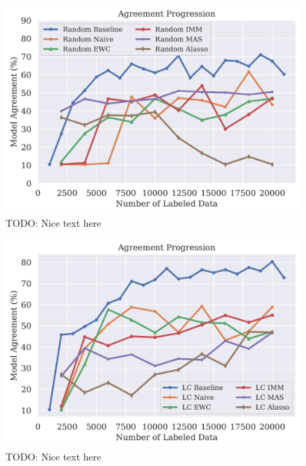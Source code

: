 \begin{figure}[h]
    \centering
    \includegraphics[width=0.8\linewidth]{images/results_CALMS/mnist_label_random.png}
    \caption[Agreement Comparison for Model Stealing on MNIST using the top1-label and the Active Learning strategy Random]{TODO: Nice text here}
    \label{fig:CALMSMNISTLabelRandom}
\end{figure}

\begin{figure}[h]
    \centering
    \includegraphics[width=0.8\linewidth]{images/results_CALMS/mnist_label_lc.png}
    \caption[Agreement Comparison for Model Stealing on MNIST using the top1-label and the Active Learning strategy LC]{TODO: Nice text here}
    \label{fig:CALMSMNISTLabelLC}
\end{figure}


